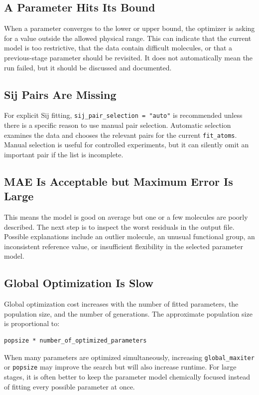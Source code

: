 \documentclass[11pt]{article}
\begin{document}
\subsection{A Parameter Hits Its Bound}

When a parameter converges to the lower or upper bound, the optimizer is asking
for a value outside the allowed physical range. This can indicate that the
current model is too restrictive, that the data contain difficult molecules, or
that a previous-stage parameter should be revisited. It does not automatically
mean the run failed, but it should be discussed and documented.

\subsection{Sij Pairs Are Missing}

For explicit Sij fitting, \texttt{sij\_pair\_selection = "auto"} is recommended
unless there is a specific reason to use manual pair selection. Automatic
selection examines the data and chooses the relevant pairs for the current
\texttt{fit\_atoms}. Manual selection is useful for controlled experiments, but
it can silently omit an important pair if the list is incomplete.

\subsection{MAE Is Acceptable but Maximum Error Is Large}

This means the model is good on average but one or a few molecules are poorly
described. The next step is to inspect the worst residuals in the output file.
Possible explanations include an outlier molecule, an unusual functional group,
an inconsistent reference value, or insufficient flexibility in the selected
parameter model.

\subsection{Global Optimization Is Slow}

Global optimization cost increases with the number of fitted parameters, the
population size, and the number of generations. The approximate population size
is proportional to:

\begin{lstlisting}
popsize * number_of_optimized_parameters
\end{lstlisting}

When many parameters are optimized simultaneously, increasing
\texttt{global\_maxiter} or \texttt{popsize} may improve the search but will also
increase runtime. For large stages, it is often better to keep the parameter
model chemically focused instead of fitting every possible parameter at once.
\end{document}
